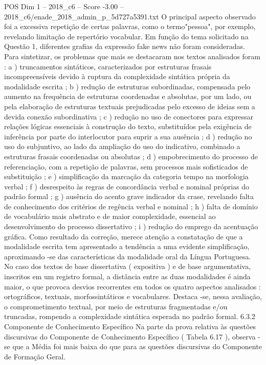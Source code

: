 \begin{textsample}{POS Dim 1 – 2018\_c6 – Score -3.00 – 2018\_c6/enade\_2018\_admin\_p\_5d727a5391.txt}
O principal aspecto observado foi a excessiva repetição de certas palavras, como o termo"pessoa", por exemplo, revelando limitação de repertório vocabular.
Em função do tema solicitado na Questão 1, diferentes grafias da expressão fake news não foram consideradas.
Para sintetizar, os problemas que mais se destacaram nos textos analisados foram : a ) truncamentos sintáticos, caracterizados por estruturas frasais incompreensíveis devido à ruptura da complexidade sintática própria da modalidade escrita ; b ) redução de estruturas subordinadas, compensada pelo aumento na frequência de estruturas coordenadas e absolutas, por um lado, ou pela elaboração de estruturas textuais prejudicadas pelo excesso de ideias sem a devida conexão subordinativa ; c ) redução no uso de conectores para expressar relações lógicas essenciais à construção do texto, substituídos pela exigência de inferência por parte do interlocutor para suprir a sua ausência ; d ) redução no uso do subjuntivo, ao lado da ampliação do uso do indicativo, combinado a estruturas frasais coordenadas ou absolutas ; d ) empobrecimento do processo de referenciação, com a repetição de palavras, sem processos mais sofisticados de substituição ; e ) simplificação da marcação da categoria tempo na morfologia verbal ; f ) desrespeito às regras de concordância verbal e nominal próprias do padrão formal ; g ) ausência do acento grave indicador da crase, revelando falta de conhecimento dos critérios de regência verbal e nominal ; h ) falta de domínio de vocabulário mais abstrato e de maior complexidade, essencial ao desenvolvimento do processo dissertativo ; i ) redução do emprego da acentuação gráfica.
Como resultado da correção, merece atenção a constatação de que a modalidade escrita tem apresentado a tendência a uma evidente simplificação, aproximando -se das características da modalidade oral da Língua Portuguesa.
No caso dos textos de base dissertativa ( expositiva ) e de base argumentativa, inscritos em um registro formal, a distância entre as duas modalidades é ainda maior, o que provoca desvios recorrentes em todos os quatro aspectos analisados : ortográficos, textuais, morfossintáticos e vocabulares.
Destaca -se, nessa avaliação, o comprometimento textual, por meio de estruturas fragmentadas e/ou truncadas, rompendo a complexidade sintática esperada no padrão formal. 6.3.2 Componente de Conhecimento Específico Na parte da prova relativa às questões discursivas do Componente de Conhecimento Específico ( Tabela 6.17 ), observa -se que a Média foi mais baixa do que para as questões discursivas do Componente de Formação Geral.

\end{textsample}
